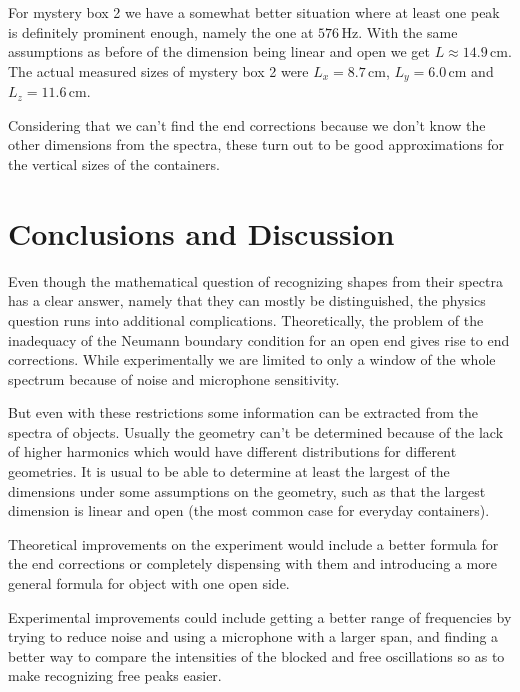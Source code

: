 \documentclass[10pt,a4paper,twocolumn]{article}
\begin{document}
For mystery box 2 we have a somewhat better situation where at least one peak is definitely prominent enough, namely the one at $576 \, \mathrm{Hz}$. With the same assumptions as before of the dimension being linear and open we get $L \approx 14.9 \, \mathrm{cm}$. The actual measured sizes of mystery box 2 were $L_x = 8.7 \, \mathrm{cm}$, $L_y = 6.0 \, \mathrm{cm}$ and $L_z = 11.6 \, \mathrm{cm}$.

Considering that we can't find the end corrections because we don't know the other dimensions from the spectra, these turn out to be good approximations for the vertical sizes of the containers.


\section{Conclusions and Discussion}

Even though the mathematical question of recognizing shapes from their spectra has a clear answer, namely that they can mostly be distinguished, the physics question runs into additional complications. Theoretically, the problem of the inadequacy of the Neumann boundary condition for an open end gives rise to end corrections. While experimentally we are limited to only a window of the whole spectrum because of noise and microphone sensitivity.

But even with these restrictions some information can be extracted from the spectra of objects. Usually the geometry can't be determined because of the lack of higher harmonics which would have different distributions for different geometries. It is usual to be able to determine at least the largest of the dimensions under some assumptions on the geometry, such as that the largest dimension is linear and open (the most common case for everyday containers).

Theoretical improvements on the experiment would include a better formula for the end corrections or completely dispensing with them and introducing a more general formula for object with one open side.

Experimental improvements could include getting a better range of frequencies by trying to reduce noise and using a microphone with a larger span, and finding a better way to compare the intensities of the blocked and free oscillations so as to make recognizing free peaks easier.

\printbibliography
\end{document}
